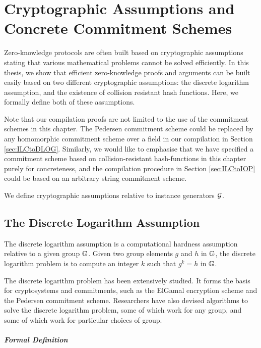 \chapter{Cryptographic Assumptions and Concrete Commitment Schemes}
\label{chapterlabel:Cryptographic-Assumptions}

Zero-knowledge protocols are often built based on cryptographic assumptions stating that various mathematical problems cannot be solved efficiently. In this thesis, we show that efficient zero-knowledge proofs and arguments can be built easily based on two different cryptographic assumptions: the discrete logarithm assumption, and the existence of collision resistant hash functions. Here, we formally define both of these assumptions.

Note that our compilation proofs are not limited to the use of the commitment schemes in this chapter. The Pedersen commitment scheme could be replaced by any homomorphic commitment scheme over a field in our compilation in Section \ref{sec:ILCtoDLOG}. Similarly, we would like to emphasise that we have specified a commitment scheme based on collision-resistant hash-functions in this chapter purely for concreteness, and the compilation procedure in Section \ref{sec:ILCtoIOP} could be based on an arbitrary string commitment scheme.

We define cryptographic assumptions relative to instance generators $\mathcal{G}$.

\section{The Discrete Logarithm Assumption}

The discrete logarithm assumption is a computational hardness assumption relative to a given group $\mathbb{G}$. Given two group elements $g$ and $h$ in $\mathbb{G}$, the discrete logarithm problem is to compute an integer $k$ such that $g^k = h$ in $\mathbb{G}$.

The discrete logarithm problem has been extensively studied. It forms the basis for cryptosystems and commitments, such as the ElGamal encryption scheme and the Pedersen commitment scheme. Researchers have also devised algorithms to solve the discrete logarithm problem, some of which work for any group, and some of which work for particular choices of group.

\paragraph{Formal Definition}

